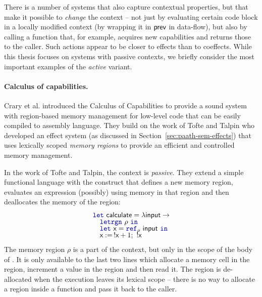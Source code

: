 There is a number of systems that also capture contextual properties, but that make it possible to 
\emph{change} the context -- not just by evaluating certain code block in a locally modified context
(\eg by wrapping it in $\textnormal{\sffamily prev}$ in data-flow), but also by calling a function that, for example, 
acquires new capabilities and returns those to the caller. Such actions appear to be closer to 
effects than to coeffects. While this thesis focuses on systems with passive contexts, we briefly 
consider the most important examples of the \emph{active} variant.


\paragraph{Calculus of capabilities.}
\label{sec:applications-active-ccc}

Crary et al. \cite{app-capabilities} introduced the Calculus of Capabilities to provide 
a sound system with region-based memory management for low-level code that can be easily 
compiled to assembly language. They build on the work of Tofte and Talpin \cite{app-region-memory}
who developed an effect system (as discussed in Section~\ref{sec:paath-sem-effects}) that uses
lexically scoped \emph{memory regions} to provide an efficient and controlled memory management.

In the work of Tofte and Talpin, the context is \emph{passive}. They extend a simple functional language
with the  construct that defines a new memory region, evaluates an expression (possibly)
using memory in that region and then deallocates the memory of the region:
%
\begin{equation*}
\begin{array}{l}
\kvd{let}~\ident{calculate} = \lambda \ident{input} \rightarrow\\[-0.25em]
\quad \kvd{letrgn}~\rho~\kvd{in}\\[-0.25em]
\quad \kvd{let}~\ident{x} = \kvd{ref}_\rho ~\ident{input}~\kvd{in}\\[-0.25em]
\quad \ident{x} :=\, !\ident{x} + 1;~ !\ident{x}
\end{array}
\end{equation*}
%
The memory region $\rho$ is a part of the context, but only in the scope of the body of 
. It is only available to the last two lines which allocate a memory cell in the region,
increment a value in the region and then read it. The region is de-allocated when the execution 
leaves its lexical scope -- there is no way to allocate a region inside a function and pass it back 
to the caller.

